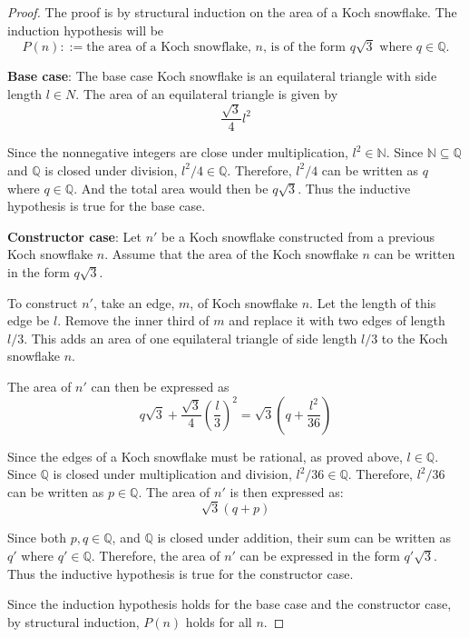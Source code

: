 \documentclass{article}
\begin{document}
\begin{proof}
  The proof is by structural induction on the area of a Koch snowflake. The
  induction hypothesis will be
  $$ P(n) ::= \textrm{the area of a Koch snowflake, } n \textrm{, is of the form
  } q \sqrt{3} \textrm{ where } q \in \mathbb{Q}. $$

  \noindent
  \textbf{Base case}: The base case Koch snowflake is an equilateral triangle
  with side length $l \in N$. The area of an equilateral triangle is given by
  $$ \frac{ \sqrt{3} }{ 4 }l^{2} $$

  Since the nonnegative integers are close under multiplication, $l^{2} \in
  \mathbb{N}$. Since $\mathbb{N} \subseteq \mathbb{Q}$ and $\mathbb{Q}$ is
  closed under division, $l^{2}/4 \in \mathbb{Q}$. Therefore, $l^{2}/4$ can be
  written as $q$ where $q \in \mathbb{Q}$. And the total area would then be
  $q\sqrt{3}$. Thus the inductive hypothesis is true for the base case.

  \bigbreak

  \noindent
  \textbf{Constructor case}: Let $n'$ be a Koch snowflake constructed from a
  previous Koch snowflake $n$. Assume that the area of the Koch snowflake $n$
  can be written in the form $q\sqrt{3}$.

  To construct $n'$, take an edge, $m$, of Koch snowflake $n$. Let the length of
  this edge be $l$. Remove the inner third of $m$ and replace it with two edges
  of length $l/3$. This adds an area of one equilateral triangle of side length
  $l/3$ to the Koch snowflake $n$.

  The area of $n'$ can then be expressed as
  $$ q\sqrt{3} + \frac{ \sqrt{3} }{ 4 } \left(\frac{ l }{ 3 }\right)^{2} =
  \sqrt{3} \left( q + \frac{ l^{2} }{ 36 } \right) $$

  Since the edges of a Koch snowflake must be rational, as proved above, $l \in
  \mathbb{Q}$. Since $\mathbb{Q}$ is closed under multiplication and division,
  $l^{2}/36 \in \mathbb{Q}$. Therefore, $l^{2}/36$ can be written as $p \in
  \mathbb{Q}$. The area of $n'$ is then expressed as:
  $$ \sqrt{3} \left( q + p \right) $$

  Since both $p,q \in \mathbb{Q}$, and $\mathbb{Q}$ is closed under addition,
  their sum can be written as $q'$ where $q' \in \mathbb{Q}$. Therefore, the
  area of $n'$ can be expressed in the form $q'\sqrt{3}$. Thus the inductive
  hypothesis is true for the constructor case.

  \bigbreak

  Since the induction hypothesis holds for the base case and the constructor
  case, by structural induction, $P(n)$ holds for all $n$.
\end{proof}
\end{document}
